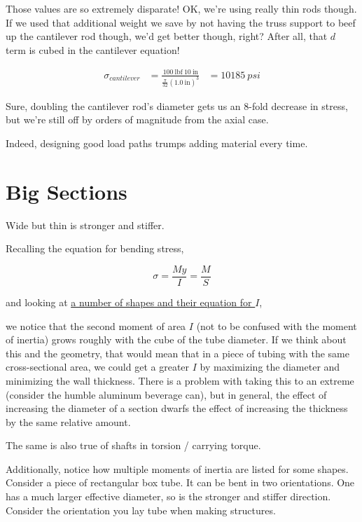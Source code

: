 Those values are so extremely disparate! OK, we're using really thin rods though. If we used that additional weight we save by not having the truss support to beef up the cantilever rod though, we'd get better though, right? After all, that $d$ term is cubed in the cantilever equation!

\begin{align}
	\sigma_{cantilever} &= \frac{100 \ \mbox{lbf} \ 10 \ \mbox{in}}{\frac{\pi}{32} (1.0 \ \mbox{in})^3} &= 10185 \ psi
\end{align}

Sure, doubling the cantilever rod's diameter gets us an 8-fold decrease in stress, but we're still off by orders of magnitude from the axial case.

Indeed, designing good load paths trumps adding material every time.

\section{Big Sections}
\begin{theorem} \label{theorem:big_sections}
Wide but thin is stronger and stiffer.
\end{theorem}

Recalling the equation for bending stress,

\begin{equation*}
	\sigma = \frac{M y}{I} = \frac{M}{S}
\end{equation*}

and looking at \href{https://en.wikipedia.org/wiki/List_of_second_moments_of_area}{\color{red}\underline{a number of shapes and their equation for $I$}},

 we notice that the second moment of area $I$ (not to be confused with the moment of inertia) grows roughly with the cube of the tube diameter. If we think about this and the geometry, that would mean that in a piece of tubing with the same cross-sectional area, we could get a greater $I$ by maximizing the diameter and minimizing the wall thickness. There is a problem with taking this to an extreme (consider the humble aluminum beverage can), but in general, the effect of increasing the diameter of a section dwarfs the effect of increasing the thickness by the same relative amount.

The same is also true of shafts in torsion / carrying torque.

Additionally, notice how multiple moments of inertia are listed for some shapes. Consider a piece of rectangular box tube. It can be bent in two orientations. One has a much larger effective diameter, so is the stronger and stiffer direction. Consider the orientation you lay tube when making structures.

